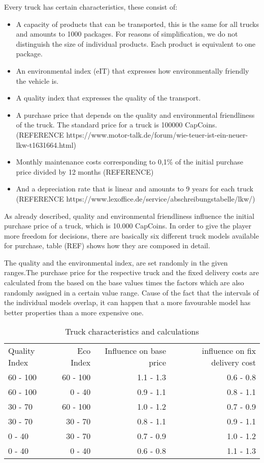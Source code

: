 Every truck has certain characteristics, these consist of:
\begin{itemize}
    \item A capacity of products that can be transported, this is the same for all trucks and amounts to 1000 packages. For reasons of simplification, we do not distinguish the size of individual products.  Each product is equivalent to one package. 
    \item An environmental index (eIT) that expresses how environmentally friendly the vehicle is.
    \item A quality index that expresses the quality of the transport.
    \item A purchase price that depends on the quality and environmental friendliness of the truck. The standard price for a truck is 100000 CapCoins. (REFERENCE https://www.motor-talk.de/forum/wie-teuer-ist-ein-neuer-lkw-t1631664.html)
    \item Monthly maintenance costs corresponding to 0,1\% of the initial purchase price divided by 12 months (REFERENCE)
    \item And a depreciation rate that is linear and amounts to 9 years for each truck (REFERENCE https://www.lexoffice.de/service/abschreibungstabelle/lkw/) 
\end{itemize}

As already described, quality and environmental friendliness influence the initial purchase price of a truck, which is 10.000 CapCoins. In order to give the player more freedom for decisions, there are basically six different truck models available for purchase, table (REF) shows how they are composed in detail. 

The quality and the environmental index, are set randomly in the given ranges.The purchase price for the respective truck and the fixed delivery costs are calculated from the based on the base values times the factors which are also randomly assigned in a certain value range. Cause of the fact that the intervals of the individual models overlap, it can happen that a more favourable model has better properties than a more expensive one.


\begin{table}[ht]
    \centering
    \begin{tabular}{|l|r|r|r|}
    \hline
    Quality Index & Eco Index & Influence on base price & influence on fix delivery cost \\
    60 - 100      & 60 - 100   & 1.1 - 1.3   & 0.6 - 0.8       \\
    60 - 100      & 0 - 40     & 0.9 - 1.1   & 0.8 - 1.1       \\
    30 - 70       & 60 - 100   & 1.0 - 1.2   & 0.7 - 0.9       \\
    30 - 70       & 30 - 70    & 0.8 - 1.1   & 0.9 - 1.1       \\
    0 - 40        & 30 - 70    & 0.7 - 0.9   & 1.0 - 1.2       \\
    0 - 40        & 0 - 40     & 0.6 - 0.8   & 1.1 - 1.3       \\
    \hline
    \end{tabular}
    \caption{Truck characteristics and calculations}
    \label{Truck_characteristics}
\end{table}

